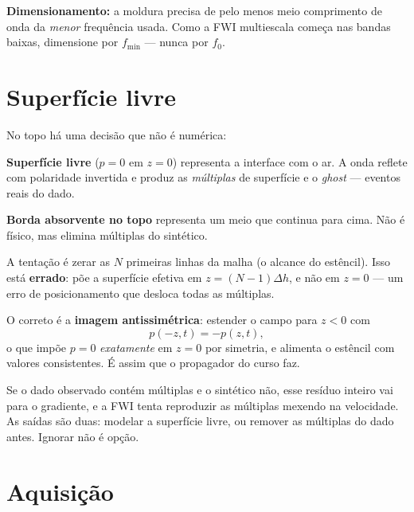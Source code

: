 \documentclass[11pt,a4paper,oneside]{report}
\begin{document}
\textbf{Dimensionamento:} a moldura precisa de pelo menos meio comprimento de
onda da \emph{menor} frequ\^encia usada. Como a FWI multiescala come\c{c}a nas
bandas baixas, dimensione por $f_{\min}$ --- nunca por $f_0$.

\section{Superf\'icie livre}

No topo h\'a uma decis\~ao que n\~ao \'e num\'erica:

\textbf{Superf\'icie livre} ($p = 0$ em $z = 0$) representa a interface com o
ar. A onda reflete com polaridade invertida e produz as \emph{m\'ultiplas} de
superf\'icie e o \emph{ghost} --- eventos reais do dado.

\textbf{Borda absorvente no topo} representa um meio que continua para cima.
N\~ao \'e f\'isico, mas elimina m\'ultiplas do sint\'etico.

\begin{derivacao}[Implementar $p=0$ corretamente: o m\'etodo das imagens]
A tenta\c{c}\~ao \'e zerar as $N$ primeiras linhas da malha (o alcance do
est\^encil). Isso est\'a \textbf{errado}: p\~oe a superf\'icie efetiva em
$z = (N-1)\Delta h$, e n\~ao em $z = 0$ --- um erro de posicionamento que
desloca todas as m\'ultiplas.

O correto \'e a \textbf{imagem antissim\'etrica}: estender o campo para
$z < 0$ com
\begin{equation}
p(-z, t) = -p(z, t),
\end{equation}
o que imp\~oe $p = 0$ \emph{exatamente} em $z = 0$ por simetria, e alimenta o
est\^encil com valores consistentes. \'E assim que o propagador do curso faz.
\end{derivacao}

\begin{armadilha}
Se o dado observado cont\'em m\'ultiplas e o sint\'etico n\~ao, esse res\'iduo
inteiro vai para o gradiente, e a FWI tenta reproduzir as m\'ultiplas mexendo
na velocidade. As sa\'idas s\~ao duas: modelar a superf\'icie livre, ou
remover as m\'ultiplas do dado antes. Ignorar n\~ao \'e op\c{c}\~ao.
\end{armadilha}

\section{Aquisi\c{c}\~ao}
\label{sec:aquisicao}
\end{document}
